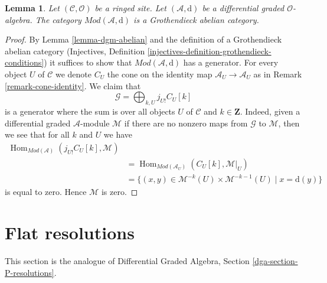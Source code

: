 \documentclass{stacks-project}
\theoremstyle{plain}
\newtheorem{lemma}[subsection]{Lemma}
\theoremstyle{definition}
\theoremstyle{remark}
\numberwithin{equation}{subsection}
\def\Hom{\mathop{\mathrm{Hom}}\nolimits}
\begin{document}
\begin{lemma}
\label{lemma-dgm-grothendieck-abelian}
Let $(\mathcal{C}, \mathcal{O})$ be a ringed site.
Let $(\mathcal{A}, \text{d})$ be a differential graded $\mathcal{O}$-algebra.
The category $\textit{Mod}(\mathcal{A}, \text{d})$
is a Grothendieck abelian category.
\end{lemma}

\begin{proof}
By Lemma \ref{lemma-dgm-abelian} and the definition of a Grothendieck
abelian category
(Injectives, Definition \ref{injectives-definition-grothendieck-conditions})
it suffices to
show that $\textit{Mod}(\mathcal{A}, \text{d})$
has a generator. For every object $U$ of $\mathcal{C}$ we denote
$C_U$ the cone on the identity map $\mathcal{A}_U \to \mathcal{A}_U$
as in Remark \ref{remark-cone-identity}. We claim that
$$
\mathcal{G} = \bigoplus\nolimits_{k, U} j_{U!}C_U[k]
$$
is a generator where the sum is over all objects $U$ of $\mathcal{C}$
and $k \in \mathbf{Z}$. Indeed, given a
differential graded $\mathcal{A}$-module $\mathcal{M}$
if there are no nonzero maps from $\mathcal{G}$ to $\mathcal{M}$,
then we see that for all $k$ and $U$ we have
\begin{align*}
\Hom_{\textit{Mod}(\mathcal{A})}(j_{U!}C_U[k], \mathcal{M}) \\
& =
\Hom_{\textit{Mod}(\mathcal{A}_U)}(C_U[k], \mathcal{M}|_U) \\
& =
\{(x, y) \in \mathcal{M}^{-k}(U) \times \mathcal{M}^{-k - 1}(U) \mid
x = \text{d}(y)\}
\end{align*}
is equal to zero. Hence $\mathcal{M}$ is zero.
\end{proof}











\section{Flat resolutions}
\label{section-P-resolutions}

\noindent
This section is the analogue of
Differential Graded Algebra, Section \ref{dga-section-P-resolutions}.
\end{document}
